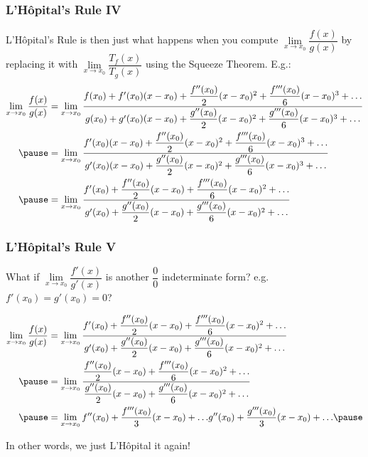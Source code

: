 \documentclass{ltx-talk}
\begin{document}
\begin{frame}
  \frametitle{L'Hôpital's Rule IV}

  L'Hôpital's Rule is then just what happens when you compute $\lim\limits_{x \rightarrow x_0} \dfrac{f(x)}{g(x)}$
  by replacing it with $\lim\limits_{x \rightarrow x_0} \dfrac{T_f(x)}{T_g(x)}$ using the Squeeze Theorem.
  E.g.:
  \begin{align}
    \lim\limits_{x \rightarrow x_0} \dfrac{f(x)}{g(x)} &= \lim\limits_{x \rightarrow x_0} \dfrac{f(x_0) + f'(x_0)(x - x_0) + \dfrac{f''(x_0)}{2}(x - x_0)^2 + \dfrac{f'''(x_0)}{6}(x - x_0)^3 + \ldots}{g(x_0) + g'(x_0)(x - x_0) + \dfrac{g''(x_0)}{2} (x - x_0)^2 + \dfrac{g'''(x_0)}{6}(x - x_0)^3 + \ldots} \\ \pause
                                                       &= \lim\limits_{x \rightarrow x_0} \dfrac{f'(x_0)(x - x_0) + \dfrac{f''(x_0)}{2}(x - x_0)^2 + \dfrac{f'''(x_0)}{6}(x - x_0)^3 + \ldots}{g'(x_0)(x - x_0) + \dfrac{g''(x_0)}{2}(x - x_0)^2 + \dfrac{g'''(x_0)}{6}(x - x_0)^3 + \ldots} \\ \pause
                                                       &= \lim\limits_{x \rightarrow x_0} \dfrac{f'(x_0) + \dfrac{f''(x_0)}{2} (x - x_0) + \dfrac{f'''(x_0)}{6} (x - x_0)^2 + \ldots}{g'(x_0) + \dfrac{g''(x_0)}{2} (x - x_0) + \dfrac{g'''(x_0)}{6} (x - x_0)^2 + \ldots}
  \end{align}
\end{frame}
\begin{frame}
  \frametitle{L'Hôpital's Rule V}
  What if $\lim\limits_{x \rightarrow x_0} \dfrac{f'(x)}{g'(x)}$ is another $\dfrac{0}{0}$ indeterminate form? \pause e.g. $f'(x_0) = g'(x_0) = 0$? \pause

  \begin{align}
    \lim\limits_{x \rightarrow x_0} \dfrac{f(x)}{g(x)} &= \lim\limits_{x \rightarrow x_0} \dfrac{f'(x_0) + \dfrac{f''(x_0)}{2}(x - x_0) + \dfrac{f'''(x_0)}{6}(x - x_0)^2 + \ldots}{g'(x_0) + \dfrac{g''(x_0)}{2}(x - x_0) + \dfrac{g'''(x_0)}{6}(x - x_0)^2 + \ldots} \\ \pause
                                                       &= \lim\limits_{x \rightarrow x_0} \dfrac{\dfrac{f''(x_0)}{2}(x - x_0) + \dfrac{f'''(x_0)}{6}(x - x_0)^2 + \ldots}{\dfrac{g''(x_0)}{2}(x - x_0) + \dfrac{g'''(x_0)}{6}(x - x_0)^2 + \ldots} \\ \pause
                                                       &= \lim\limits_{x \rightarrow x_0}{f''(x_0) + \dfrac{f'''(x_0)}{3}(x - x_0) + \ldots}{g''(x_0) + \dfrac{g'''(x_0)}{3}(x - x_0) + \ldots} \pause
  \end{align}

  In other words, we just L'Hôpital it again!
\end{frame}
\end{document}
